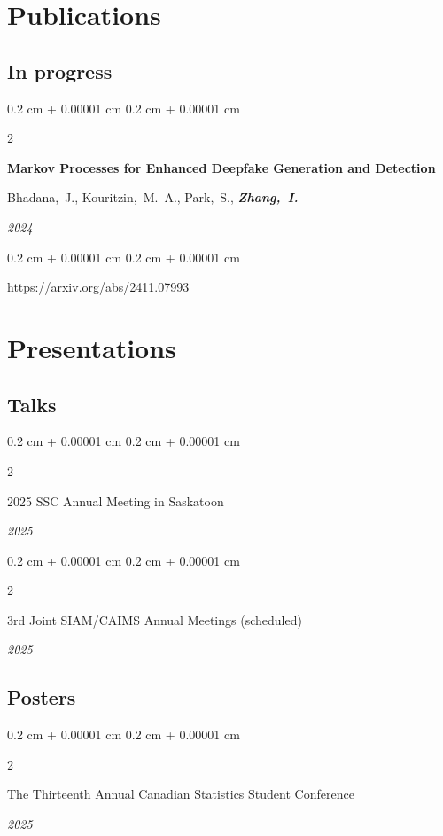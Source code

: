 \documentclass[10pt, letterpaper]{article}
\newenvironment{onecolentry}{
    \begin{adjustwidth}{
        0.2 cm + 0.00001 cm
    }{
        0.2 cm + 0.00001 cm
    }
}{
    \end{adjustwidth}
} %
\newenvironment{twocolentry}[2][]{
    \onecolentry
    \def\secondColumn{#2}
    \setcolumnwidth{\fill, 4.5 cm}
    \begin{paracol}{2}
}{
    \switchcolumn \raggedleft \secondColumn
    \end{paracol}
    \endonecolentry
} %
\begin{document}
        \vspace{0.2 cm}


    \section{Publications}
    \subsection{In progress}

        \begin{samepage}
            \begin{twocolentry}{
                \textit{2024}
            }
                \textbf{Markov Processes for Enhanced Deepfake Generation and
                Detection}

                \vspace{0.10 cm}

                \mbox{Bhadana, J.}, \mbox{Kouritzin, M. A.}, \mbox{Park, S.}, \mbox{\textbf{\textit{Zhang, I.}}}
            \end{twocolentry}
            \vspace{0.10 cm}
            \begin{onecolentry}
                \url{https://arxiv.org/abs/2411.07993}
            \end{onecolentry}
        \end{samepage}


    \section{Presentations}
    \subsection{Talks}
    \begin{twocolentry}
        {\textit{2025}}
        2025 SSC Annual Meeting in Saskatoon
    \end{twocolentry}
    \begin{twocolentry}
        {\textit{2025}}
        3rd Joint SIAM/CAIMS Annual Meetings (scheduled)
    \end{twocolentry}

    \subsection{Posters}
    \begin{twocolentry}
        {\textit{2025}}
        The Thirteenth Annual Canadian Statistics Student Conference

    \end{twocolentry}
\end{document}
